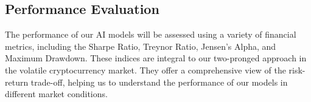 \documentclass[journal]{IEEEtran}
\begin{document}
\subsection{Performance Evaluation}
The performance of our AI models will be assessed using a variety of financial metrics, including the Sharpe Ratio, Treynor Ratio, Jensen's Alpha, and Maximum Drawdown. These indices are integral to our two-pronged approach in the volatile cryptocurrency market. They offer a comprehensive view of the risk-return trade-off, helping us to understand the performance of our models in different market conditions.



\end{document}
